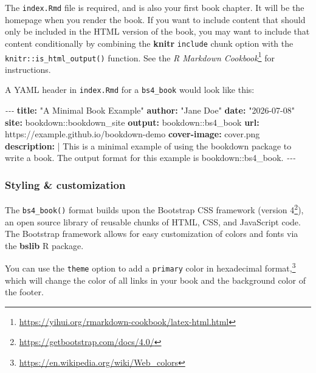 \documentclass[
  12pt,
]{krantz}
\newenvironment{Shaded}{\begin{snugshade}}{\end{snugshade}}
\newcommand{\AttributeTok}[1]{\textcolor[rgb]{0.13,0.29,0.53}{#1}}
\newcommand{\CharTok}[1]{\textcolor[rgb]{0.31,0.60,0.02}{#1}}
\newcommand{\FunctionTok}[1]{\textcolor[rgb]{0.13,0.29,0.53}{\textbf{#1}}}
\newcommand{\KeywordTok}[1]{\textcolor[rgb]{0.13,0.29,0.53}{\textbf{#1}}}
\newcommand{\NormalTok}[1]{#1}
\newcommand{\PreprocessorTok}[1]{\textcolor[rgb]{0.56,0.35,0.01}{\textit{#1}}}
\newcommand{\StringTok}[1]{\textcolor[rgb]{0.31,0.60,0.02}{#1}}
\renewcommand{\href}[2]{#2\footnote{\url{#1}}}
\theoremstyle{definition}
\theoremstyle{definition}
\theoremstyle{definition}
\theoremstyle{definition}
\theoremstyle{remark}
\begin{document}
The \texttt{index.Rmd} file is required, and is also your first book chapter. It will be the homepage when you render the book. If you want to include content that should only be included in the HTML version of the book, you may want to include that content conditionally by combining the \textbf{knitr} \texttt{include} chunk option with the \texttt{knitr::is\_html\_output()} function. See the \href{https://yihui.org/rmarkdown-cookbook/latex-html.html}{\emph{R Markdown Cookbook}} for instructions.

A YAML header in \texttt{index.Rmd} for a \texttt{bs4\_book} would look like this:

\begin{Shaded}
\begin{Highlighting}[]
\PreprocessorTok{{-}{-}{-}}
\FunctionTok{title}\KeywordTok{:}\AttributeTok{ }\StringTok{"A Minimal Book Example"}
\FunctionTok{author}\KeywordTok{:}\AttributeTok{ }\StringTok{"Jane Doe"}
\FunctionTok{date}\KeywordTok{:}\AttributeTok{ }\StringTok{"2026{-}07{-}08"}
\FunctionTok{site}\KeywordTok{:}\AttributeTok{ bookdown::bookdown\_site}
\FunctionTok{output}\KeywordTok{:}\AttributeTok{ bookdown::bs4\_book}
\FunctionTok{url}\KeywordTok{:}\AttributeTok{ https://example.github.io/bookdown{-}demo}
\FunctionTok{cover{-}image}\KeywordTok{:}\AttributeTok{ cover.png}
\FunctionTok{description}\KeywordTok{: }\CharTok{|}
\NormalTok{  This is a minimal example of using the bookdown package to write a book.}
\NormalTok{  The output format for this example is bookdown::bs4\_book.}
\PreprocessorTok{{-}{-}{-}}
\end{Highlighting}
\end{Shaded}

\subsubsection{Styling \& customization}\label{styling-customization}

The \texttt{bs4\_book()} format builds upon the Bootstrap CSS framework (\href{https://getbootstrap.com/docs/4.0/}{version 4}), an open source library of reusable chunks of HTML, CSS, and JavaScript code. The Bootstrap framework allows for easy customization of colors and fonts via the \textbf{bslib} R package.

You can use the \texttt{theme} option to add a \texttt{primary} color in \href{https://en.wikipedia.org/wiki/Web_colors}{hexadecimal format,} which will change the color of all links in your book and the background color of the footer.
\end{document}
